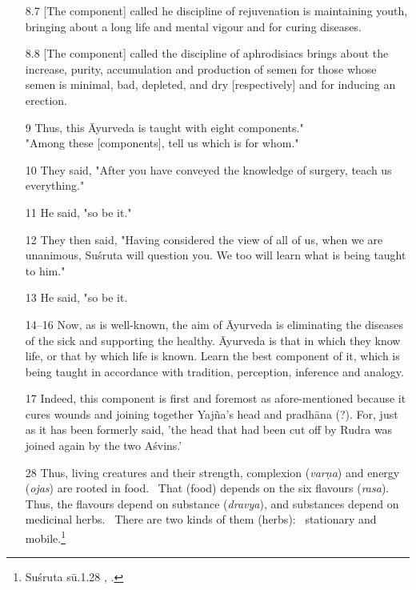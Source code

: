 \documentclass[12pt]{article}
\newcommand{\saneng}[2]{#2 (\emph{#1})}
\begin{document}
\begin{itemize}
        \item[8.7] [The component] called he discipline of rejuvenation is maintaining youth, bringing about a long life and mental vigour and for curing diseases.
        
        
        \item[8.8] [The component] called the discipline of aphrodisiacs brings about the increase, purity, accumulation and  production of semen for those whose semen is minimal, bad, depleted, and dry [respectively] and for inducing an erection.
        
        \item[9] Thus, this Āyurveda is taught with eight components."\\ 
        
        "Among these [components], tell us which is for whom."
        
        \item[10] They said, "After you have conveyed the knowledge of surgery, teach us everything."
        
        \item[11] He said, "so be it."
        
        \item[12] They then said, "Having considered the view of all of us, when we are unanimous, Suśruta will question you. We too will learn what is being taught to him."
        
        \item[13] He said, "so be it.
        
        \item[14–16] Now, as is well-known, the aim of Āyurveda is eliminating the diseases of the sick and supporting the healthy.  Āyurveda is that in which they know life, or that by which life is known. Learn the best component of it, which is being taught in accordance with tradition, perception, inference and analogy.
        
        \item[17] Indeed, this component is first and foremost as afore-mentioned because it cures wounds and joining together Yajña's head and pradhāna (?). For, just as it has been formerly said,  'the head that had been cut off by Rudra was joined again by the two Aśvins.'
    
    
    

  
    \newpage
    
    
    \item [28] Thus, living creatures and their strength,
\saneng{varṇa}{complexion} and \saneng{ojas}{energy} are rooted in food.  That
(food) depends on the six \saneng{rasa}{flavours}. Thus, the flavours depend
on \saneng{dravya}{substance}, and substances depend on medicinal herbs. 
There are two kinds of them (herbs):  stationary and mobile.\footnote{Suśruta
sū.1.28 \cite[I, 21]{shar-susr}, \cite[7]{susr-trikamji2004}.}
\end{itemize}
\end{document}
